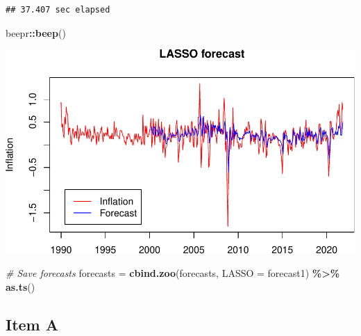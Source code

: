 \documentclass[
]{article}
\newenvironment{Shaded}{\begin{snugshade}}{\end{snugshade}}
\newcommand{\AttributeTok}[1]{\textcolor[rgb]{0.13,0.29,0.53}{#1}}
\newcommand{\CommentTok}[1]{\textcolor[rgb]{0.56,0.35,0.01}{\textit{#1}}}
\newcommand{\FunctionTok}[1]{\textcolor[rgb]{0.13,0.29,0.53}{\textbf{#1}}}
\newcommand{\NormalTok}[1]{#1}
\newcommand{\OtherTok}[1]{\textcolor[rgb]{0.56,0.35,0.01}{#1}}
\newcommand{\SpecialCharTok}[1]{\textcolor[rgb]{0.81,0.36,0.00}{\textbf{#1}}}
\begin{document}
\begin{verbatim}
## 37.407 sec elapsed
\end{verbatim}

\begin{Shaded}
\begin{Highlighting}[]
\NormalTok{beepr}\SpecialCharTok{::}\FunctionTok{beep}\NormalTok{()}
\end{Highlighting}
\end{Shaded}

\includegraphics{Trabalho_Econo4_Q2_files/figure-latex/unnamed-chunk-23-1.pdf}

\begin{Shaded}
\begin{Highlighting}[]
\CommentTok{\# Save forecasts}
\NormalTok{forecasts }\OtherTok{=} \FunctionTok{cbind.zoo}\NormalTok{(forecasts, }\AttributeTok{LASSO =}\NormalTok{ forecast1) }\SpecialCharTok{\%\textgreater{}\%}
    \FunctionTok{as.ts}\NormalTok{()}
\end{Highlighting}
\end{Shaded}

\hypertarget{item-a}{%
\subsection{Item A}\label{item-a}}
\end{document}
